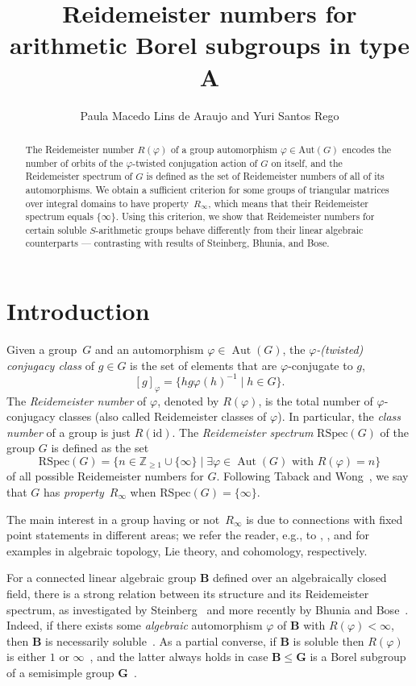 \documentclass[a4paper,11pt]{amsart}
\title[Reidemeister numbers for soluble arithmetic groups]{Reidemeister numbers for arithmetic Borel subgroups in type A}
\author{Paula Macedo Lins de Araujo and Yuri Santos Rego}
\numberwithin{equation}{section}
\theoremstyle{plain}
\theoremstyle{definition}
\newcommand{\Z}{\mathbb{Z}}
\newcommand{\mbB}{\mathbf{B}} %
\newcommand{\mbG}{\mathbf{G}} %
\newcommand{\phee}{\varphi} %
\newcommand{\set}[1]{\{ #1 \}}
\newcommand{\Ri}{R_{\infty}} %
\newcommand{\RSpec}{\mathrm{RSpec}}
\DeclareMathOperator{\Aut}{Aut}
\begin{document}
\begin{abstract}
The Reidemeister number $R(\varphi)$ of a group automorphism $\varphi \in \mathrm{Aut}(G)$ encodes the number of orbits of the $\varphi$-twisted conjugation action of $G$ on itself, and the Reidemeister spectrum of $G$ is defined as the set of Reidemeister numbers of all of its automorphisms. We obtain a sufficient criterion for some groups of triangular matrices over integral domains to have property~$R_\infty$, which means that their Reidemeister spectrum equals $\{\infty\}$. Using this criterion, we show that Reidemeister numbers for certain soluble $S$-arithmetic groups behave differently from their linear algebraic counterparts --- contrasting with results of Steinberg, Bhunia, and Bose.  
\end{abstract}
\maketitle \vspace{-1.0cm}
\thispagestyle{empty}

\section{Introduction} 
Given a group~$G$ and an automorphism $\phee\in\Aut(G)$, the $\phee$\emph{-(twisted) conjugacy class} of $g\in G$ is the set of elements that are $\phee$-conjugate to $g$, 
\[ [g]_\phee = \set{h g \phee(h)^{-1} \mid h \in G}. \]
The \emph{Reidemeister number} of $\phee$, denoted by $R(\phee)$, is the total number of $\phee$-conjugacy classes (also called {Reidemeister classes} of $\phee$). In particular, the \emph{class number} of a group is just $R(\mathrm{id})$. 
The \emph{Reidemeister spectrum} $\RSpec(G)$ of the group $G$ is defined as the set 
\[\RSpec(G)= \{n \in \Z_{\geq 1} \cup \{\infty\} \mid \exists \phee \in \Aut(G) \text{ with } R(\phee)=n\}\] 
of all possible Reidemeister numbers for $G$. Following Taback and Wong~\cite{TabackWong0}, we say that $G$ has \emph{property}~$\Ri$ when $\RSpec(G) = \{\infty\}$.

The main interest in a group having or not~$\Ri$ is due to connections with fixed point statements in different areas; we refer the reader, e.g., to \cite[Theorem~6.1]{DacibergWongCrelle}, \cite[Theorem~10.1]{SteinbergEndo}, and \cite[Theorem~5.4]{Brasuca0} for examples in algebraic topology, Lie theory, and cohomology, respectively. 

For a connected linear algebraic group $\mbB$ defined over an algebraically closed field, there is a strong relation between its structure and its Reidemeister spectrum, as investigated by Steinberg~\cite{SteinbergEndo} and more recently by Bhunia and Bose~\cite{BhuniaBose1,BhuniaBose2}. Indeed, if there exists some \emph{algebraic} automorphism $\phee$ of $\mbB$ with $R(\phee) < \infty$, then $\mbB$ is necessarily soluble~\cite[Theorem~17]{BhuniaBose1}. As a partial converse, if $\mbB$ is soluble then $R(\phee)$ is either $1$ or $\infty$~\cite[Theorem~2.4]{BhuniaBose2}, and the latter always holds in case $\mbB \leq \mbG$ is a Borel subgroup of a semisimple group $\mbG$~\cite[Theorem~2.10]{BhuniaBose2}. 
\end{document}
